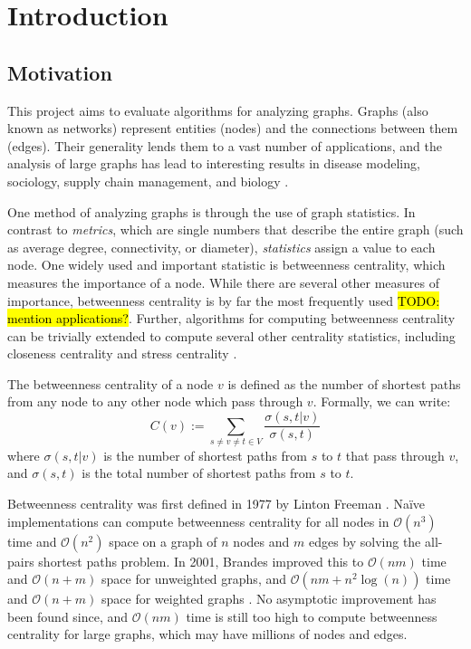 \documentclass[12pt,a4paper,twoside,openright]{report}
\begin{document}
	
	\pagestyle{headings}
	
	\chapter{Introduction}
	
	\section{Motivation}
	This project aims to evaluate algorithms for analyzing graphs. Graphs (also known as networks) represent entities (nodes) and the connections between them (edges). Their generality lends them to a vast number of applications, and the analysis of large graphs has lead to interesting results in disease modeling, sociology, supply chain management, and biology \cite{disease}\cite{social}\cite{supply}\cite{bio}.
	
	One method of analyzing graphs is through the use of graph statistics. In contrast to \textit{metrics}, which are single numbers that describe the entire graph (such as average degree, connectivity, or diameter), \textit{statistics} assign a value to each node. One widely used and important statistic is betweenness centrality, which measures the importance of a node. While there are several other measures of importance, betweenness centrality is by far the most frequently used \cite{geisberger} \hl{TODO: mention applications?}. Further, algorithms for computing betweenness centrality can be trivially extended to compute several other centrality statistics, including closeness centrality and stress centrality \cite{brandes}.
	
	The betweenness centrality of a node $v$ is defined as the number of shortest paths from any node to any other node which pass through $v$. Formally, we can write: \begin{equation} \label{eq:1}
		C(v) := \sum_{s\neq v \neq t \in V} \frac{\sigma(s,t|v)}{\sigma(s,t)}
	\end{equation}
	where $\sigma(s,t|v)$ is the number of shortest paths from $s$ to $t$ that pass through $v$, and $\sigma(s,t)$ is the total number of shortest paths from $s$ to $t$.
	
	Betweenness centrality was first defined in 1977 by Linton Freeman \cite{freeman}. Na\"{i}ve implementations can compute betweenness centrality for all nodes in $\mathcal{O}(n^3)$ time and $\mathcal{O}(n^2)$ space on a graph of $n$ nodes and $m$ edges by solving the all-pairs shortest paths problem. In 2001, Brandes improved this to $\mathcal{O}(nm)$ time and $\mathcal{O}(n+m)$ space for unweighted graphs, and $\mathcal{O}(nm+n^2\log(n))$ time and $\mathcal{O}(n+m)$ space for weighted graphs \cite{brandes}. No asymptotic improvement has been found since, and $\mathcal{O}(nm)$ time is still too high to compute betweenness centrality for large graphs, which may have millions of nodes and edges.
	
\end{document}
